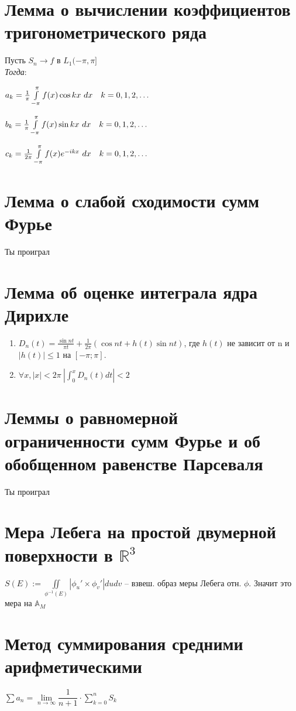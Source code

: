 \documentclass[paper=a4, fontsize=14pt]{article}
\begin{document}
\section{Лемма о вычислении коэффициентов тригонометрического ряда}

Пусть $S_n \rightarrow f$ в $L_1(-\pi, \pi]$\\

\emph{Тогда}:

$a_k = \frac{1}{\pi}\int\limits_{-\pi}^{\pi}f(x)\cos kx\ dx \quad k = 0, 1, 2, \mathellipsis$

$b_k = \frac{1}{\pi}\int\limits_{-\pi}^{\pi}f(x)\sin kx\ dx \quad k = 0, 1, 2, \mathellipsis$

$c_k = \frac{1}{2\pi}\int\limits_{-\pi}^{\pi}f(x)e^{-ikx}\ dx \quad k = 0, 1, 2, \mathellipsis$

\section{Лемма о слабой сходимости сумм Фурье}
Ты проиграл

\section{Лемма об оценке интеграла ядра Дирихле}
\begin{enumerate}
\item $D_n(t) = \frac{\sin nt}{\pi t} + \frac{1}{2\pi}(\cos nt + h(t)\sin nt)$, где $h(t)$ не зависит от n и $|h(t)| \leq 1$
на $[-\pi;\pi]$.
\item $\forall x, |x| < 2\pi\ |\int_0^x D_n(t) dt| < 2$
\end{enumerate}
\section{Леммы о равномерной ограниченности сумм Фурье и об обобщенном равенстве Парсеваля}
Ты проиграл

\section{Мера Лебега на простой двумерной поверхности в $\mathds{R}^3$}

$ S(E) := \iint\limits_{\phi^{-1}(E)} | \phi_u' \times \phi_v'| dudv $ -- взвеш. образ меры Лебега отн. $ \phi $. Значит это мера на $ \mathbb{A}_{M} $

\section{Метод суммирования средними арифметическими}
$\sum a_n = \lim\limits_{n \to \infty} \dfrac{1}{n+1} \cdot \sum\limits_{k=0}^n S_k$
\end{document}
